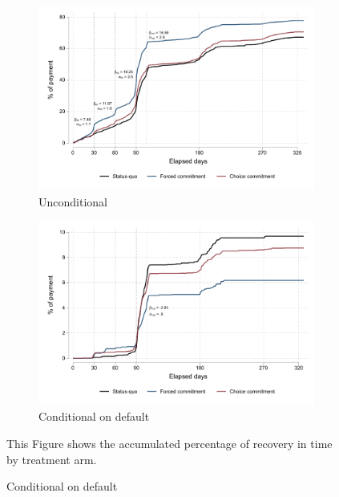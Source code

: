 \begin{figure}[H]
        \caption{\% of payment over time}
    \label{porc_payment_over_time}
    \begin{center}
   \begin{subfigure}{0.49\textwidth}
        \caption{Unconditional}
        \centering
        \includegraphics[width=\textwidth]{Figuras/cumulative_porc_pay_time.pdf}
    \end{subfigure} 
   \begin{subfigure}{0.49\textwidth}
        \caption{Conditional on default}
        \centering
        \includegraphics[width=\textwidth]{Figuras/cumulative_porc_pay_time_default.pdf}
    \end{subfigure}     
    \end{center}
     \scriptsize  This Figure shows the accumulated percentage of recovery in time by treatment arm. 
\end{figure}

















